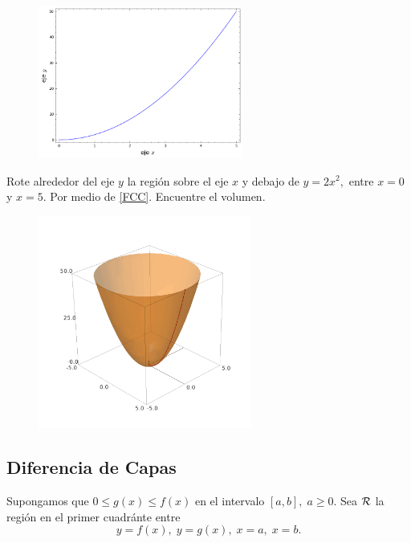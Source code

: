 \begin{resuelto}
\begin{figure}
 \centering
 \includegraphics[height=5cm,keepaspectratio=true]{./calculo/sage0505.png}
 \label{fig:sage:0505}
\end{figure}

Rote alrededor del eje $y$ la regi\'on sobre el eje $x$ y debajo de $y=2x^{2},$ entre $x=0$ y $x=5.$ Por medio de \eqref{FCC}. Encuentre el volumen.
\end{resuelto}



\begin{figure}
 \centering
 \includegraphics[height=7cm,keepaspectratio=true]{./calculo/sage0506.png}
 \label{fig:sage:0506}
\end{figure}



\subsection{Diferencia de Capas}


Supongamos que $0\leq g(x) \leq f(x)$ en el intervalo $[a,b], \; a \geq 0.$ Sea $\mathcal{R}$ la regi\'on en el primer cuadránte entre $$y=f(x), \; y=g(x), \; x=a, \; x=b.$$

